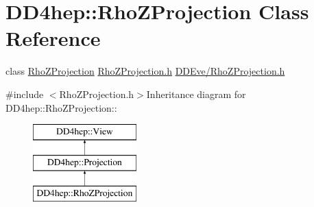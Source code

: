 \hypertarget{class_d_d4hep_1_1_rho_z_projection}{
\section{DD4hep::RhoZProjection Class Reference}
\label{class_d_d4hep_1_1_rho_z_projection}
}


class \hyperlink{class_d_d4hep_1_1_rho_z_projection}{RhoZProjection} \hyperlink{_rho_z_projection_8h}{RhoZProjection.h} \hyperlink{_rho_z_projection_8h}{DDEve/RhoZProjection.h}  


{\ttfamily \#include $<$RhoZProjection.h$>$}Inheritance diagram for DD4hep::RhoZProjection::\begin{figure}[H]
\begin{center}
\leavevmode
\includegraphics[height=3cm]{class_d_d4hep_1_1_rho_z_projection}
\end{center}
\end{figure}
